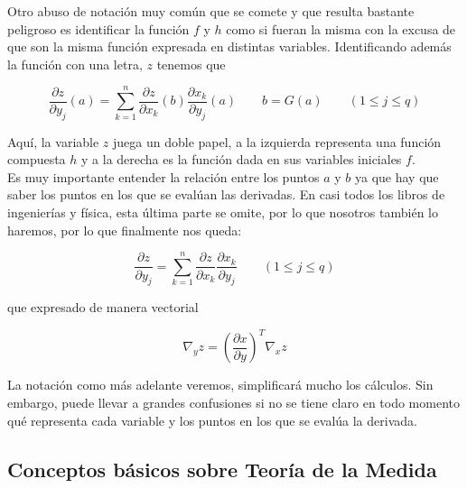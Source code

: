          Otro abuso de notación muy común que se comete y que resulta bastante peligroso es identificar la función $f$ y $h$ como si fueran la misma con la excusa de que son la misma función expresada en distintas variables. Identificando además la función con una letra, $z$ tenemos que 
         
         \begin{equation}
             \frac{\partial z}{\partial y_j}(a) = \sum_{k=1}^{n} \frac{\partial z}{\partial x_k}(b)\frac{\partial x_k}{\partial y_j}(a) \qquad b = G(a) \qquad (1 \leq j \leq q )
         \end{equation}
         
         \noindent Aquí, la variable $z$ juega un doble papel, a la izquierda representa una función compuesta $h$ y a la derecha es la función dada en sus variables iniciales $f$. \\
         
         Es muy importante entender la relación entre los puntos $a$ y $b$ ya que hay que saber los puntos en los que se evalúan las derivadas. En casi todos los libros de ingenierías y física, esta última parte se omite, por lo que nosotros también lo haremos, por lo que finalmente nos queda:
         
         \begin{equation}
             \frac{\partial z}{\partial y_j} = \sum_{k=1}^{n} \frac{\partial z}{\partial x_k}\frac{\partial x_k}{\partial y_j}  \qquad (1 \leq j \leq q )
         \end{equation}
         
         \noindent que expresado de manera vectorial
         
         \begin{equation}
            \nabla_{y}z = \left(\frac{\partial x}{\partial y}\right)^T \nabla_{x}z
         \end{equation} 
         
         
         La notación como más adelante veremos, simplificará mucho los cálculos. Sin embargo, puede llevar a grandes confusiones si no se tiene claro en todo momento qué representa cada variable y los puntos en los que se evalúa la derivada. \\

\subsection{Conceptos básicos sobre Teoría de la Medida}
    
